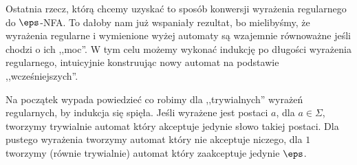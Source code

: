     Ostatnia rzecz, którą chcemy uzyskać to sposób konwersji wyrażenia regularnego do \(\eps\)-NFA. To dałoby nam już wspaniały rezultat, bo mielibyśmy, że wyrażenia regularne i wymienione wyżej automaty są wzajemnie równoważne jeśli chodzi o ich ,,moc''. W tym celu możemy wykonać indukcję po długości wyrażenia regularnego, intuicyjnie konstruując nowy automat na podstawie ,,wcześniejszych''.
    
    Na początek wypada powiedzieć co robimy dla ,,trywialnych'' wyrażeń regularnych, by indukcja się spięła. Jeśli wyrażene jest postaci \(a\), dla \( a \in \Sigma\), tworzymy trywialnie automat który akceptuje jedynie słowo takiej postaci. Dla pustego wyrażenia tworzymy automat który nie akceptuje niczego, dla \(1\) tworzymy (równie trywialnie) automat który zaakceptuje jedynie \(\eps\). 
    
